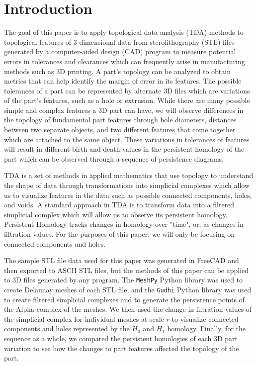 \documentclass[ma]{uncgdissertationexp}
\theoremstyle{plain}
\theoremstyle{definition}
\theoremstyle{remark}
\begin{document}
\chapter{Introduction}

\par The goal of this paper is to apply topological data analysis (TDA) methods to topological features of 3-dimensional data from sterolithography (STL) files generated by a computer-aided design (CAD) program to measure potential errors in tolerances and clearances which can frequently arise in manufacturing methods such as 3D printing. A part's topology can be analyzed to obtain metrics that can help identify the margin of error in its features. The possible tolerances of a part can be represented by alternate 3D files which are variations of the part's features, such as a hole or extrusion. While there are many possible simple and complex features a 3D part can have, we will observe differences in the topology of fundamental part features through hole diameters, distances between two separate objects, and two different features that come together which are attached to the same object. These variations in tolerances of features will result in different birth and death values in the persistent homology of the part which can be observed through a sequence of persistence diagrams.
\par TDA is a set of methods in applied mathematics that use topology to understand the shape of data through transformations into simplicial complexes which allow us to visualize features in the data such as possible connected components, holes, and voids. A standard approach in TDA is to transform data into a filtered simplicial complex which will allow us to observe its persistent homology. Persistent Homology tracks changes in homology over "time", or, as changes in filtration values. For the purposes of this paper, we will only be focusing on connected components and holes. 
\par The sample STL file data used for this paper was generated in FreeCAD and then exported to ASCII STL files, but the methods of this paper can be applied to 3D files generated by any program. The \verb"MeshPy" Python library was used to create Delaunay meshes of each STL file, and the \verb"Gudhi" Python library was used to create filtered simplicial complexes and to generate the persistence points of the Alpha complex of the meshes. We then used the change in filtration values of the simplicial complex for individual meshes at scale $r$ to visualize connected components and holes represented by the $H_0$ and $H_1$ homology. Finally, for the sequence as a whole, we compared the persistent homologies of each 3D part variation to see how the changes to part features affected the topology of the part.
\end{document}
